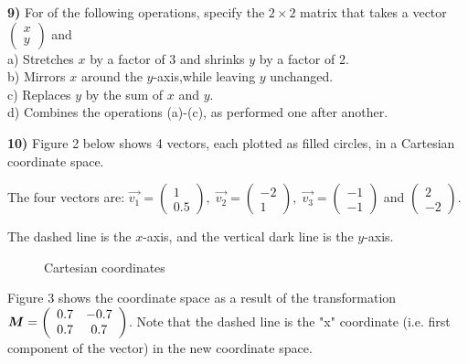 \documentclass[11pt]{article}
\begin{document}
\textbf{9)} For of the following operations, specify the $2\times 2$ matrix that takes a vector 
$\left( \begin{array}{c} x \\ y \end{array} \right)$ and \svs \\ \svs
\hspace*{5mm} a) Stretches $x$ by a factor of 3 and shrinks $y$ by a factor of 2. \\ \svs
\hspace*{5mm} b) Mirrors $x$ around the $y$-axis,while leaving $y$ unchanged. \\ \svs
\hspace*{5mm} c) Replaces $y$ by the sum of $x$ and $y$. \\ 
\hspace*{5mm} d) Combines the operations (a)-(c), as performed one after another.

\textbf{10)} Figure 2 below shows 4 vectors,
each plotted as filled circles, in a Cartesian coordinate space.

\hspace*{6mm} The four vectors are: 
$\vec{v_1}=\left( \begin{array}{c} 1 \\ 0.5 \end{array} \right), \;
\vec{v_2}=\left( \begin{array}{c} -2 \\ 1 \end{array} \right), \;
\vec{v_3}=\left( \begin{array}{c} -1 \\ -1 \end{array} \right)$ and 
$\left( \begin{array}{c} 2 \\ -2 \end{array} \right)$. 

\hspace*{6mm} The dashed line is the $x$-axis, and the vertical dark line is the $y$-axis. \svs

\begin{figure}[!ht]
   \centerline{\epsfxsize=10cm  } \svs
   \caption{Cartesian coordinates} 
\end{figure}

Figure 3 shows the coordinate space as a result of the transformation
$\mbox{\boldmath $M$} =  \left( \begin{array}{cc} 0.7 & -0.7 \\ 0.7 & 0.7 \end{array} \right)$. 
Note that the  dashed line is the "x" coordinate (i.e.
first component of the vector) in the new coordinate space.
\end{document}
